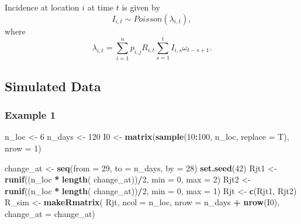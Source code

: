 \documentclass[11pt,]{article}
\newenvironment{Shaded}{\begin{snugshade}}{\end{snugshade}}
\newcommand{\KeywordTok}[1]{\textcolor[rgb]{0.13,0.29,0.53}{\textbf{#1}}}
\newcommand{\DataTypeTok}[1]{\textcolor[rgb]{0.13,0.29,0.53}{#1}}
\newcommand{\DecValTok}[1]{\textcolor[rgb]{0.00,0.00,0.81}{#1}}
\newcommand{\StringTok}[1]{\textcolor[rgb]{0.31,0.60,0.02}{#1}}
\newcommand{\OperatorTok}[1]{\textcolor[rgb]{0.81,0.36,0.00}{\textbf{#1}}}
\newcommand{\NormalTok}[1]{#1}
\begin{document}
Incidence at location \(i\) at time \(t\) is given by \[
  I_{i, t} \sim Poisson(\lambda_{i, t}),
\] where \[
 \lambda_{i, t} = \sum_{i = 1}^{n}{p_{i, j}R_{i, t}
                                   \sum_{s = 1}^{t}{I_{i, s} 
                                   \omega_{t - s + 1}}}.
\]

\subsection{Simulated Data}\label{simulated-data}

\subsubsection{Example 1}\label{example-1}

\begin{Shaded}
\begin{Highlighting}[]
\NormalTok{n_loc  <-}\StringTok{ }\DecValTok{6}
\NormalTok{n_days <-}\StringTok{ }\DecValTok{120}
\NormalTok{I0     <-}\StringTok{ }\KeywordTok{matrix}\NormalTok{(}\KeywordTok{sample}\NormalTok{(}\DecValTok{10}\OperatorTok{:}\DecValTok{100}\NormalTok{, n_loc, }\DataTypeTok{replace =}\NormalTok{ T),}
                 \DataTypeTok{nrow =} \DecValTok{1}\NormalTok{)}



\NormalTok{change_at <-}\StringTok{ }\KeywordTok{seq}\NormalTok{(}\DataTypeTok{from =} \DecValTok{29}\NormalTok{, }\DataTypeTok{to =}\NormalTok{ n_days, }\DataTypeTok{by =} \DecValTok{28}\NormalTok{)}
\KeywordTok{set.seed}\NormalTok{(}\DecValTok{42}\NormalTok{)}
\NormalTok{Rjt1    <-}\StringTok{ }\KeywordTok{runif}\NormalTok{((n_loc }\OperatorTok{*}\StringTok{ }\KeywordTok{length}\NormalTok{( change_at))}\OperatorTok{/}\DecValTok{2}\NormalTok{,}
                 \DataTypeTok{min =} \DecValTok{0}\NormalTok{, }\DataTypeTok{max =} \DecValTok{2}\NormalTok{) }
\NormalTok{Rjt2    <-}\StringTok{ }\KeywordTok{runif}\NormalTok{((n_loc }\OperatorTok{*}\StringTok{ }\KeywordTok{length}\NormalTok{( change_at))}\OperatorTok{/}\DecValTok{2}\NormalTok{,}
                 \DataTypeTok{min =} \DecValTok{0}\NormalTok{, }\DataTypeTok{max =} \DecValTok{1}\NormalTok{) }
\NormalTok{Rjt    <-}\StringTok{ }\KeywordTok{c}\NormalTok{(Rjt1, Rjt2)}
\NormalTok{R_sim  <-}\StringTok{ }\KeywordTok{makeRmatrix}\NormalTok{( Rjt,}
                       \DataTypeTok{ncol =}\NormalTok{ n_loc,}
                       \DataTypeTok{nrow =}\NormalTok{ n_days }\OperatorTok{+}\StringTok{ }\KeywordTok{nrow}\NormalTok{(I0),}
                       \DataTypeTok{change_at =}\NormalTok{ change_at)}
\end{Highlighting}
\end{Shaded}
\end{document}
